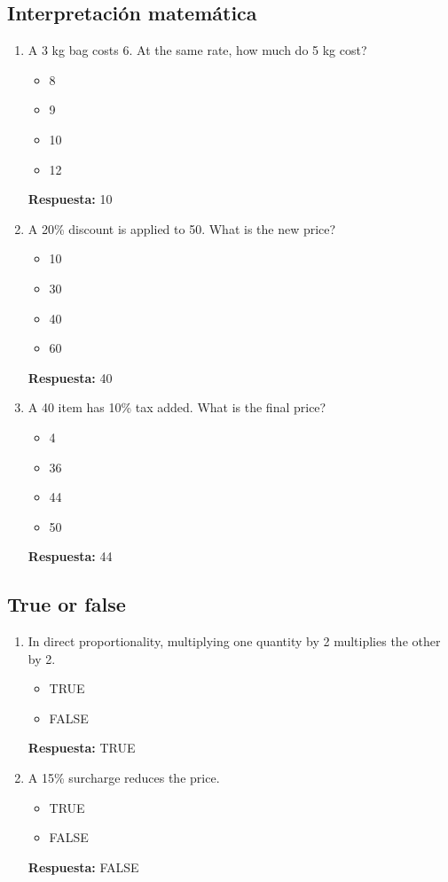 \documentclass[11pt,a4paper]{article}
\begin{document}
\subsection{Interpretaci\'on matem\'atica}
\begin{enumerate}
\item A 3 kg bag costs \texteuro{}6. At the same rate, how much do 5 kg cost?
\begin{itemize}
\item \texteuro{}8
\item \texteuro{}9
\item \texteuro{}10
\item \texteuro{}12
\end{itemize}
\textbf{Respuesta:} \texteuro{}10
\item A 20\% discount is applied to \texteuro{}50. What is the new price?
\begin{itemize}
\item \texteuro{}10
\item \texteuro{}30
\item \texteuro{}40
\item \texteuro{}60
\end{itemize}
\textbf{Respuesta:} \texteuro{}40
\item A \texteuro{}40 item has 10\% tax added. What is the final price?
\begin{itemize}
\item \texteuro{}4
\item \texteuro{}36
\item \texteuro{}44
\item \texteuro{}50
\end{itemize}
\textbf{Respuesta:} \texteuro{}44
\end{enumerate}
\subsection{True or false}
\begin{enumerate}
\item In direct proportionality, multiplying one quantity by 2 multiplies the other by 2.
\begin{itemize}
\item TRUE
\item FALSE
\end{itemize}
\textbf{Respuesta:} TRUE
\item A 15\% surcharge reduces the price.
\begin{itemize}
\item TRUE
\item FALSE
\end{itemize}
\textbf{Respuesta:} FALSE
\end{enumerate}
\end{document}
